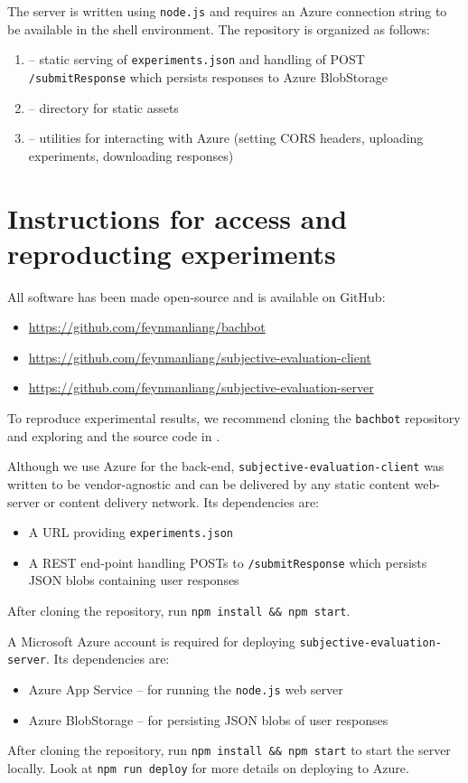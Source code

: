 The server is written using \texttt{node.js} and requires an Azure connection string to be
available in the shell environment. The repository is organized as follows:
\begin{enumerate}
    \item {} -- static serving of \texttt{experiments.json} and handling
        of POST \texttt{/submitResponse} which persists responses to Azure BlobStorage
    \item {} -- directory for static assets
    \item {} -- utilities for interacting with Azure (\eg setting CORS headers,
        uploading experiments, downloading responses)
\end{enumerate}

\section{Instructions for access and reproducting experiments}

All software has been made open-source and is available on GitHub:
\begin{itemize}
    \item \url{https://github.com/feynmanliang/bachbot}
    \item \url{https://github.com/feynmanliang/subjective-evaluation-client}
    \item \url{https://github.com/feynmanliang/subjective-evaluation-server}
\end{itemize}

To reproduce experimental results, we recommend cloning the \texttt{bachbot} repository
and exploring  and the source code in .

Although we use Azure for the back-end, \texttt{subjective-evaluation-client}
was written to be vendor-agnostic and can be delivered by any static content
web-server or content delivery network. Its dependencies are:
\begin{itemize}
    \item A URL providing \texttt{experiments.json}
    \item A REST end-point handling POSTs to \texttt{/submitResponse} which persists
        JSON blobs containing user responses
\end{itemize}
After cloning the repository, run \texttt{npm install \&\& npm start}.

A Microsoft Azure account is required for deploying \texttt{subjective-evaluation-server}.
Its dependencies are:
\begin{itemize}
    \item Azure App Service -- for running the \texttt{node.js} web server
    \item Azure BlobStorage -- for persisting JSON blobs of user responses
\end{itemize}
After cloning the repository, run \texttt{npm install \&\& npm start} to start the server
locally. Look at \texttt{npm run deploy} for more details on deploying to Azure.

